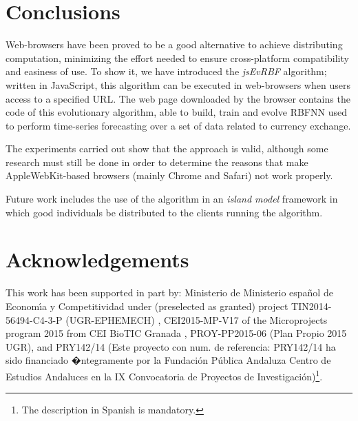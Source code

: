 \documentclass{article}
\begin{document}
\section{Conclusions}
\label{sec:conclusions}
Web-browsers have been proved to be a good alternative to achieve
distributing computation, minimizing the effort needed to ensure
cross-platform compatibility and easiness of use. To show it, we have
introduced the {\em jsEvRBF} algorithm;
written in JavaScript, this algorithm can be executed in web-browsers
when users access to a specified URL. The web page downloaded by the
browser contains the code of this evolutionary algorithm, able to
build, train and evolve RBFNN used to perform time-series forecasting
over a set of data related to currency exchange. %

The experiments carried out show that the approach is valid,
although some research must still be done in order to determine the
reasons that make AppleWebKit-based browsers (mainly Chrome and
Safari) not work properly.

Future work includes the use of the
algorithm in an {\em island model}  framework in which good
individuals be distributed to the clients running the algorithm.



\section*{Acknowledgements}
 This work has been supported in part by:
 Ministerio de Ministerio espa\~{n}ol de Econom\'{\i}a y Competitividad under (preselected as granted) project TIN2014-56494-C4-3-P (UGR-EPHEMECH)
 , CEI2015-MP-V17 of the Microprojects program 2015 from CEI BioTIC Granada
 , PROY-PP2015-06 (Plan Propio 2015 UGR),
 and
 PRY142/14 (Este proyecto con num. de referencia: PRY142/14 ha sido financiado �ntegramente por la Fundaci\'{o}n P\'{u}blica Andaluza Centro de Estudios Andaluces en la IX Convocatoria de Proyectos de Investigaci\'{o}n)\footnote{The description in Spanish is mandatory.}.


%
%



\end{document}
